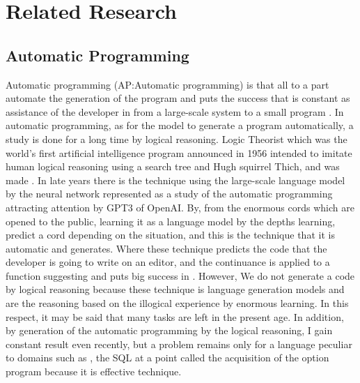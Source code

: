 \documentclass{article}
\begin{document}
\section{Related Research}
\subsection{Automatic Programming}
\label{sec:headings}
Automatic programming (AP:Automatic programming) is that all to a part automate the generation of the program and puts the success that is constant as assistance of the developer in from a large-scale system to a small program \cite{AutomaticProgramming}. 
In automatic programming, as for the model to generate a program automatically, a study is done for a long time by logical reasoning.
Logic Theorist which was the world's first artificial intelligence program announced in 1956 intended to imitate human logical reasoning using a search tree and Hugh squirrel Thich, and was made \cite{LogicTheorist}.
In late years there is the technique using the large-scale language model by the neural network represented as a study of the automatic programming attracting attention by GPT3\cite{gpt3} of OpenAI.
By, from the enormous cords which are opened to the public, learning it as a language model by the depths learning, predict a cord depending on the situation, and this is the technique that it is automatic and generates.
Where these technique predicts the code that the developer is going to write on an editor, and the continuance is applied to a function suggesting and puts big success in \cite{copilot}.
However, We do not generate a code by logical reasoning because these technique is language generation models and are the reasoning based on the illogical experience by enormous learning.
In this respect, it may be said that many tasks are left in the present age.
In addition, by generation of the automatic programming by the logical reasoning, I gain constant result even recently, but a problem remains only for a language peculiar to domains such as \cite{palsql}, the SQL at a point called the acquisition of the option program because it is effective technique.
\end{document}
